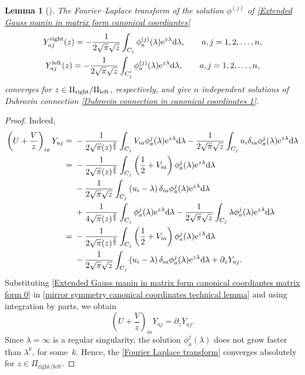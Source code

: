 \documentclass[pdftex]{sigma}
\numberwithin{equation}{section}
\newtheorem{Lemma}[Theorem]{Lemma}
\begin{document}
 \begin{Lemma}[{\cite{B.Dubrovin3}}]\label{Main lemma Mirror symmetry 1}
 The Fourier--Laplace transform of the solution $\phi^{(j)}$ of \eqref{Extended Gauss manin in matrix form canonical coordiantes}
\begin{gather}
Y^{\rm right}_{aj}(z)=-\frac{1}{2\sqrt{\pi}\sqrt{z}}\int_{C_j}\phi_a^{(j)}(\lambda){\rm e}^{z\lambda}{\rm d}\lambda, \qquad a,j=1,2,\dots,n,\nonumber\\
Y^{\rm left}_{aj}(z)=-\frac{1}{2\sqrt{\pi}\sqrt{z}}\int_{C_j^{\prime}}\phi_a^{(j)}(\lambda){\rm e}^{z\lambda}{\rm d}\lambda, \qquad a,j=1,2,\dots,n,\label{Fourier Laplace transform}
\end{gather}
converges for $z \in \Pi_{\rm right}/\Pi_{\rm left}$, respectively, and give $n$ independent solutions of Dubrovin connection \eqref{Dubrovin connection in canonical coordinates 1}.
\end{Lemma}

\begin{proof}
 Indeed,
\begin{align}
\left(U+\frac{V}{z}\right)_{ia}Y_{aj}={}&-\frac{1}{2\sqrt{\pi}(z)^{\frac{3}{2}}}\int_{C_j}V_{ia}\phi_a^{j}(\lambda){\rm e}^{z\lambda}{\rm d}\lambda-\frac{1}{2\sqrt{\pi}\sqrt{z}}\int_{C_j}u_i\delta_{ia}\phi_a^{j}(\lambda){\rm e}^{z\lambda}{\rm d}\lambda\nonumber\\
={}&-\frac{1}{2\sqrt{\pi}(z)^{\frac{3}{2}}}\int_{C_j}\left(\frac{1}{2}+V_{ia}\right)\phi_a^{j}(\lambda){\rm e}^{z\lambda}{\rm d}\lambda\nonumber\\
&-\frac{1}{2\sqrt{\pi}\sqrt{z}}\int_{C_j}\left(u_i-\lambda\right)\delta_{ia}\phi_a^{j}(\lambda){\rm e}^{z\lambda}{\rm d}\lambda\nonumber\\
&+\frac{1}{4\sqrt{\pi}(z)^{\frac{3}{2}}}\int_{C_j}\phi_a^{j}(\lambda){\rm e}^{z\lambda}{\rm d}\lambda-\frac{1}{2\sqrt{\pi}\sqrt{z}}\int_{C_j}\lambda\phi_a^{j}(\lambda){\rm e}^{z\lambda}{\rm d}\lambda\nonumber\\
={}&-\frac{1}{2\sqrt{\pi}(z)^{\frac{3}{2}}}\int_{C_j}\left(\frac{1}{2}+V_{ia}\right)\phi_a^{j}(\lambda){\rm e}^{z\lambda}{\rm d}\lambda\nonumber\\
&-\frac{1}{2\sqrt{\pi}\sqrt{z}}\int_{C_j}\left(u_i-\lambda\right)\delta_{ia}\phi_a^{j}(\lambda){\rm e}^{z\lambda}{\rm d}\lambda+\partial_zY_{aj}.\label{mirror symmetry canonical coordinates technical lemma}
\end{align}
Substituting \eqref{Extended Gauss manin in matrix form canonical coordiantes matrix form 0} in \eqref{mirror symmetry canonical coordinates technical lemma} and using integration by parts, we obtain
\[
\left(U+\frac{V}{z}\right)_{ia}Y_{aj}=\partial_zY_{aj}.
\]
Since $\lambda=\infty$ is a regular singularity, the solution $\phi_a^{j}(\lambda)$ does not grow faster than $\lambda^k$, for some~$k$. Hence, the \eqref{Fourier Laplace transform} converges absolutely for $z \in \Pi_{\text{right/left}}$.
\end{proof}
\end{document}
